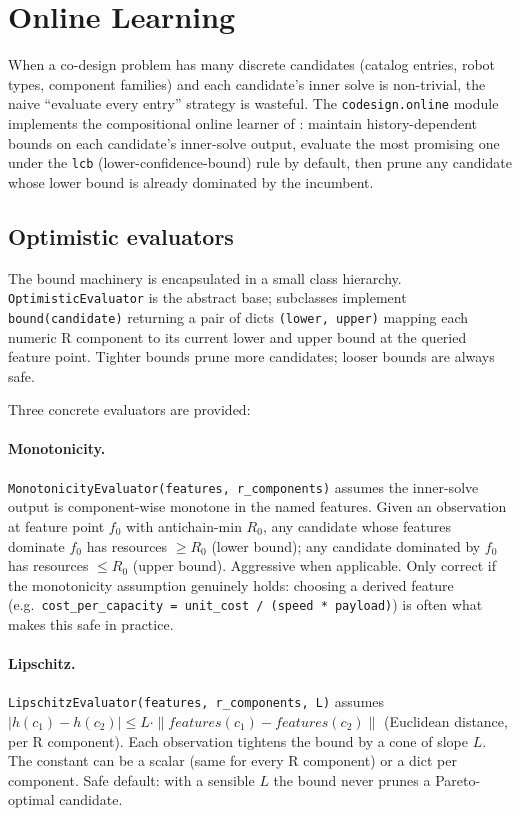 \documentclass[11pt,a4paper]{article}
\begin{document}
\section{Online Learning}
\label{sec:online-learning}

When a co-design problem has many discrete candidates (catalog
entries, robot types, component families) and each candidate's
inner solve is non-trivial, the naive ``evaluate every entry''
strategy is wasteful. The \texttt{codesign.online} module implements
the compositional online learner of
\citet{alharbi2026online}: maintain history-dependent bounds on
each candidate's inner-solve output, evaluate the most promising one
under the \texttt{lcb} (lower-confidence-bound) rule by default, then
prune any candidate whose lower bound is already dominated by the
incumbent.

\subsection{Optimistic evaluators}

The bound machinery is encapsulated in a small class hierarchy.
\texttt{OptimisticEvaluator} is the abstract base; subclasses
implement \texttt{bound(candidate)} returning a pair of dicts
\texttt{(lower, upper)} mapping each numeric R component to its
current lower and upper bound at the queried feature point. Tighter
bounds prune more candidates; looser bounds are always safe.

Three concrete evaluators are provided:

\paragraph{Monotonicity.}
\texttt{MonotonicityEvaluator(features, r\_components)} assumes the
inner-solve output is component-wise monotone in the named features.
Given an observation at feature point $f_0$ with antichain-min $R_0$,
any candidate whose features dominate $f_0$ has resources $\geq R_0$
(lower bound); any candidate dominated by $f_0$ has resources
$\leq R_0$ (upper bound). Aggressive when applicable. Only correct if
the monotonicity assumption genuinely holds: choosing a derived
feature (e.g.\ \texttt{cost\_per\_capacity = unit\_cost /
(speed * payload)}) is often what makes this safe in practice.

\paragraph{Lipschitz.}
\texttt{LipschitzEvaluator(features, r\_components, L)} assumes
$|h(c_1) - h(c_2)| \leq L \cdot \|features(c_1) - features(c_2)\|$
(Euclidean distance, per R component). Each observation tightens the
bound by a cone of slope $L$. The constant can be a scalar (same for
every R component) or a dict per component. Safe default: with a
sensible $L$ the bound never prunes a Pareto-optimal candidate.
\end{document}
